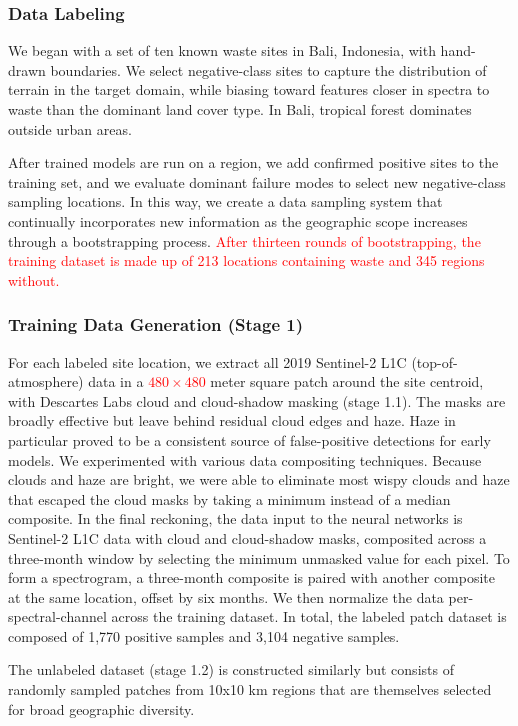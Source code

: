 \documentclass[10pt,letterpaper]{article}
\begin{document}
\subsubsection*{Data Labeling}
We began with a set of ten known waste sites in Bali, Indonesia, with hand-drawn boundaries. We select negative-class sites to capture the distribution of terrain in the target domain, while biasing toward features closer in spectra to waste than the dominant land cover type. In Bali, tropical forest dominates outside urban areas.

After trained models are run on a region, we add confirmed positive sites to the training set, and we evaluate dominant failure modes to select new negative-class sampling locations. In this way, we create a data sampling system that continually incorporates new information as the geographic scope increases through a bootstrapping process. \textcolor{red}{After thirteen rounds of bootstrapping, the training dataset is made up of 213 locations containing waste and 345 regions without.}

\subsubsection*{Training Data Generation (Stage 1)}
For each labeled site location, we extract all 2019 Sentinel-2 L1C (top-of-atmosphere) data in a \textcolor{red}{$480\times480$} meter square patch around the site centroid, with Descartes Labs cloud and cloud-shadow masking (stage 1.1). The masks are broadly effective but leave behind residual cloud edges and haze. Haze in particular proved to be a consistent source of false-positive detections for early models. We experimented with various data compositing techniques. Because clouds and haze are bright, we were able to eliminate most wispy clouds and haze that escaped the cloud masks by taking a minimum instead of a median composite. In the final reckoning, the data input to the neural networks is Sentinel-2 L1C data with cloud and cloud-shadow masks, composited across a three-month window by selecting the minimum unmasked value for each pixel. To form a spectrogram, a three-month composite is paired with another composite at the same location, offset by six months. We then normalize the data per-spectral-channel across the training dataset. In total, the labeled patch dataset is composed of 1,770 positive samples and 3,104 negative samples.

The unlabeled dataset (stage 1.2) is constructed similarly but consists of randomly sampled patches from 10x10 km regions that are themselves selected for broad geographic diversity.
\end{document}
